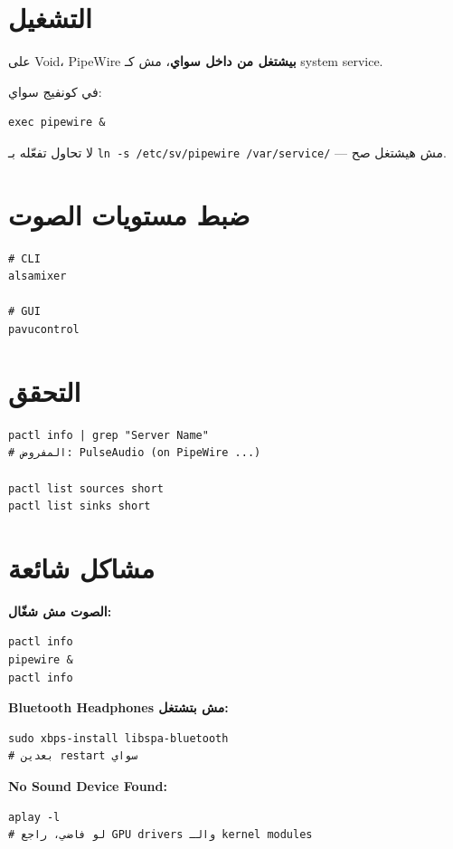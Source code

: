 \documentclass[12pt, a4paper]{report}
\begin{document}
\section{التشغيل}

على Void، PipeWire \textbf{بيشتغل من داخل سواي}، مش كـ system service.

في كونفيج سواي:
\begin{lstlisting}
exec pipewire &
\end{lstlisting}

\begin{tcolorbox}[warningbox]
لا تحاول تفعّله بـ \texttt{ln -s /etc/sv/pipewire /var/service/} --- مش هيشتغل صح.
\end{tcolorbox}

\section{ضبط مستويات الصوت}
\begin{lstlisting}
# CLI
alsamixer

# GUI
pavucontrol
\end{lstlisting}

\section{التحقق}
\begin{lstlisting}
pactl info | grep "Server Name"
# المفروض: PulseAudio (on PipeWire ...)

pactl list sources short
pactl list sinks short
\end{lstlisting}

\section{مشاكل شائعة}

\textbf{الصوت مش شغّال:}
\begin{lstlisting}
pactl info
pipewire &
pactl info
\end{lstlisting}

\textbf{Bluetooth Headphones مش بتشتغل:}
\begin{lstlisting}
sudo xbps-install libspa-bluetooth
# بعدين restart سواي
\end{lstlisting}

\textbf{No Sound Device Found:}
\begin{lstlisting}
aplay -l
# لو فاضي، راجع GPU drivers والـ kernel modules
\end{lstlisting}
\end{document}
